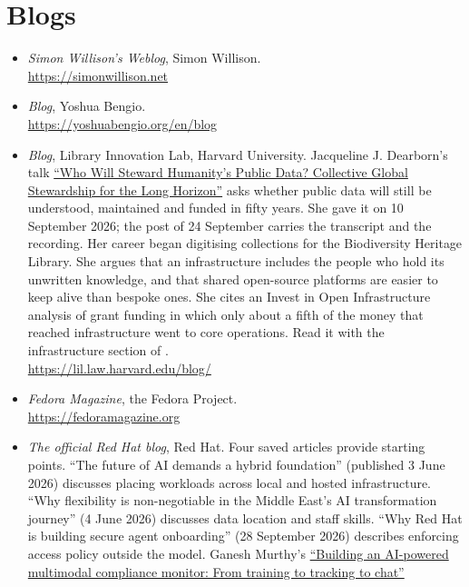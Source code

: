 \section{Blogs}

\begin{itemize}
  \item \emph{Simon Willison's Weblog}, Simon Willison.\\
    \url{https://simonwillison.net}
  \item \emph{Blog}, Yoshua Bengio.\\
    \url{https://yoshuabengio.org/en/blog}
  \item \emph{Blog}, Library Innovation Lab, Harvard University. Jacqueline
    J. Dearborn's talk
    \href{https://lil.law.harvard.edu/blog/2026/09/24/who-will-steward-humanity-s-public-data/}{``Who Will Steward Humanity's Public Data? Collective Global Stewardship for the Long Horizon''}
    asks whether public data will still be understood, maintained and funded
    in fifty years. She gave it on 10 September 2026; the post of 24 September
    carries the transcript and the recording. Her career began digitising
    collections for the Biodiversity Heritage Library. She argues that an
    infrastructure includes the people who hold its unwritten knowledge, and
    that shared open-source platforms are easier to keep alive than bespoke
    ones. She cites an Invest in Open Infrastructure analysis of grant funding
    in which only about a fifth of the money that reached infrastructure went
    to core operations. Read it with the infrastructure section of
    .\\
    \url{https://lil.law.harvard.edu/blog/}
  \item \emph{Fedora Magazine}, the Fedora Project.\\
    \url{https://fedoramagazine.org}
  \item \emph{The official Red Hat blog}, Red Hat.
    Four saved articles provide starting points.
    ``The future of AI demands a hybrid foundation'' (published 3 June 2026)
    discusses placing workloads across local and hosted infrastructure.
    ``Why flexibility is non-negotiable in the Middle East's AI
    transformation journey'' (4 June 2026) discusses data location and staff skills.
    ``Why Red Hat is building secure agent onboarding''
    (28 September 2026) describes enforcing access policy outside the model.
    Ganesh Murthy's
    \href{https://www.redhat.com/en/blog/building-ai-powered-multimodal-compliance-monitor-training-tracking-chat}{``Building an AI-powered multimodal compliance monitor: From training to tracking to chat''}

\end{itemize}
